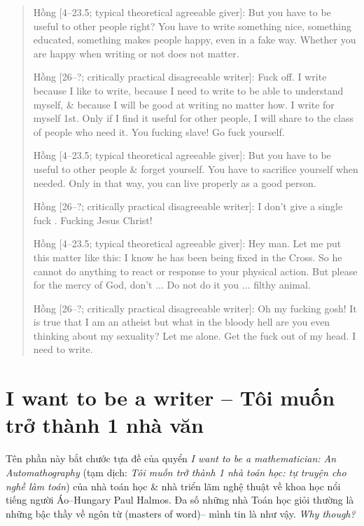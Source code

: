 \documentclass[12pt,twoside]{book}
\begin{document}
\begin{quote}
	{\sf Hồng [4--23.5; typical theoretical agreeable giver]}: But you have to be useful to other people right? You have to write something nice, something educated, something makes people happy, even in a fake way. Whether you are happy when writing or not does not matter.
	
	{\sf Hồng [26--?; critically practical disagreeable writer]}: Fuck off. I write because I like to write, because I need to write to be able to understand myself, \& because I will be good at writing no matter how. I write for myself 1st. Only if I find it useful for other people, I will share to the class of people who need it. You fucking slave! Go fuck yourself.
	
	{\sf Hồng [4--23.5; typical theoretical agreeable giver]}: But you have to be useful to other people \& forget yourself. You have to sacrifice yourself when needed. Only in that way, you can live properly as a good person.
	
	{\sf Hồng [26--?; critically practical disagreeable writer]}: I don't give a single fuck \cite{Manson_giving_fuck,Manson_giving_fuck_vn}. Fucking Jesus Christ!
	
	{\sf Hồng [4--23.5; typical theoretical agreeable giver]}: Hey man. Let me put this matter like this: I know he has been being fixed in the Cross. So he cannot do anything to react or response to your physical action. But please for the mercy of God, don't $\ldots$ Do not do it you $\ldots$ filthy animal.
	
	{\sf Hồng [26--?; critically practical disagreeable writer]}: Oh my fucking gosh! It is true that I am an atheist but what in the bloody hell are you even thinking about my sexuality? Let me alone. Get the fuck out of my head. I need to write.
\end{quote}

\section{I want to be a writer -- Tôi muốn trở thành 1 nhà văn}
\label{sect: writer wannabe}
Tên phần này bắt chước tựa đề của quyển {\it I want to be a mathematician: An Automathography} \cite{Halmos1985,Halmos1985_3_parts} (tạm dịch: {\it Tôi muốn trở thành 1 nhà toán học: tự truyện cho nghề làm toán}) của nhà toán học \& nhà triển lãm nghệ thuật về khoa học nổi tiếng người Áo--Hungary {\sc Paul Halmos}. Đa số những nhà Toán học giỏi thường là những bậc thầy về ngôn từ (masters of word)-- mình tin là như vậy. {\it Why though?}
\end{document}
